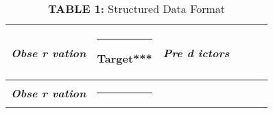\documentclass[
  12pt,
]{krantz}
\begin{document}
\begin{longtable}[]{@{}
  >{\centering\arraybackslash}p{}
  >{\centering\arraybackslash}p{}
  >{\centering\arraybackslash}p{}
  >{\centering\arraybackslash}p{}
  >{\centering\arraybackslash}p{}
  >{\centering\arraybackslash}p{}@{}}
\caption{\textbf{TABLE 1:} Structured Data Format}\tabularnewline
\toprule\noalign{}
\begin{minipage}[b]{\linewidth}\centering
\textbf{\emph{Obse
r
vation}}
\end{minipage} & \begin{minipage}[b]{\linewidth}\centering
\begin{center}\rule{0.5\linewidth}{0.5pt}\end{center}

Target***
\end{minipage} & \begin{minipage}[b]{\linewidth}\centering
\textbf{\emph{Pre
d
ictors}}
\end{minipage} & \begin{minipage}[b]{\linewidth}\centering
\end{minipage} & \begin{minipage}[b]{\linewidth}\centering
\end{minipage} & \begin{minipage}[b]{\linewidth}\centering
\end{minipage} \\
\midrule\noalign{}
\endfirsthead
\toprule\noalign{}
\begin{minipage}[b]{\linewidth}\centering
\textbf{\emph{Obse
r
vation}}
\end{minipage} & \begin{minipage}[b]{\linewidth}\centering
\begin{center}\rule{0.5\linewidth}{0.5pt}\end{center}


\end{minipage}
\end{longtable}
\end{document}
